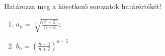 \documentclass[11pt]{scrartcl}
\begin{document}
Határozza meg a következő sorozatok határértékét!
\begin{enumerate}
	\item \(\displaystyle
	      a_n = \sqrt[n]{\frac{n^2 + 2^n}{n + 3}};
	      \)

	\item \(\displaystyle
	      b_n = \left(
	      \frac{n - 3}{n + 2}
	      \right)^{n - 5}
	      \)
\end{enumerate}
\end{document}
